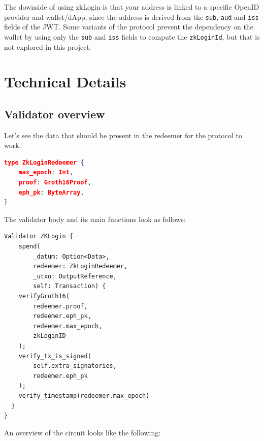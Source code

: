 \documentclass{article}
\begin{document}
The downside of using zkLogin is that your address is linked to a specific OpenID provider and wallet/dApp, since the address is derived from the \texttt{sub}, \texttt{aud} and \texttt{iss} fields of the JWT. Some variants of the protocol prevent the dependency on the wallet by using only the \texttt{sub} and \texttt{iss} fields to compute the \texttt{zkLoginId}, but that is not explored in this project.

\section{Technical Details}
\subsection{Validator overview}
Let's see the data that should be present in the redeemer for the protocol to work:

\begin{lstlisting}[language=json, caption={Transaction Redeemer format}, label={lst:json}]
type ZkLoginRedeemer {
    max_epoch: Int,
    proof: Groth16Proof,
    eph_pk: ByteArray,
}
\end{lstlisting}

The validator body and its main functions look as follows:

\begin{lstlisting}[caption={Validator body}, label={lst:rust}]
Validator ZKLogin {
    spend(
        _datum: Option<Data>,
        redeemer: ZkLoginRedeemer,
        _utxo: OutputReference,
        self: Transaction) {
    verifyGroth16(
        redeemer.proof,
        redeemer.eph_pk,
        redeemer.max_epoch,
        zkLoginID
    );
    verify_tx_is_signed(
        self.extra_signatories,
        redeemer.eph_pk
    );
    verify_timestamp(redeemer.max_epoch)
  }
}
\end{lstlisting}

An overview of the circuit looks like the following:
\end{document}
